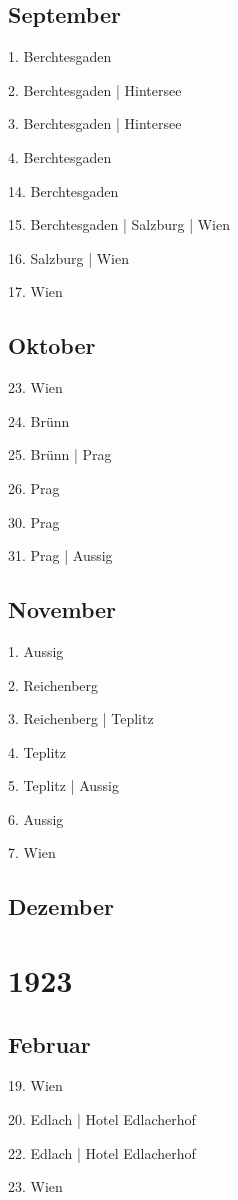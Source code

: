 \documentclass[twoside=false,titlepage=false,open=any, parskip=never, fontsize=10pt, headings=small, chapterprefix=false, appendixprefix=false, DIV=15]{scrbook}
\begin{document}
\begin{multicols}{3}
            \section*{September}
            1. Berchtesgaden\par
            2. Berchtesgaden | Hintersee\par
            3. Berchtesgaden | Hintersee\par
            4. Berchtesgaden\par
            14. Berchtesgaden\par
            15. Berchtesgaden | Salzburg | Wien\par
            16. Salzburg | Wien\par
            17. Wien\par
            \section*{Oktober}
            23. Wien\par
            24. Brünn\par
            25. Brünn | Prag\par
            26. Prag\par
            30. Prag\par
            31. Prag | Aussig\par
            \section*{November}
            1. Aussig\par
            2. Reichenberg\par
            3. Reichenberg | Teplitz\par
            4. Teplitz\par
            5. Teplitz | Aussig\par
            6. Aussig\par
            7. Wien\par
            \section*{Dezember}
            \chapter*{1923}
            \section*{Februar}
            19. Wien\par
            20. Edlach | Hotel Edlacherhof\par
            22. Edlach | Hotel Edlacherhof\par
            23. Wien\par

\end{multicols}
\end{document}
